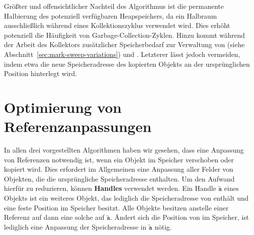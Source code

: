 Größter und offensichtlicher Nachteil des Algorithmus ist die permanente Halbierung des potenziell verfügbaren Heapspeichers, da ein Halbraum ausschließlich während eines Kollektionszyklus verwendet wird.
Dies erhöht potenziell die Häufigkeit von Garbage-Collection-Zyklen.
Hinzu kommt während der Arbeit des Kollektors zusätzlicher Speicherbedarf zur Verwaltung von  (siehe Abschnitt~\ref{sec:mark-sweep-variations}) und .
Letzterer lässt jedoch vermeiden, indem etwa die neue Speicheradresse des kopierten Objekts an der ursprünglichen Position hinterlegt wird.




\section{Optimierung von Referenzanpassungen}
\label{sec:handle}
In allen drei vorgestellten Algorithmen haben wir gesehen, dass eine Anpassung von Referenzen notwendig ist, wenn ein Objekt im Speicher verschoben oder kopiert wird.
Dies erfordert im Allgemeinen eine Anpassung aller Felder von Objekten, die die ursprüngliche Speicheradresse enthalten.
Um den Aufwand hierfür zu reduzieren, können \textbf{Handles} verwendet werden.
Ein Handle $\mathtt{\tilde{a}}$ eines Objekts  ist ein weiteres Objekt, das lediglich die Speicheradresse von  enthält und eine feste Position im Speicher besitzt.
Alle Objekte besitzen anstelle einer Referenz auf  dann eine solche auf $\mathtt{\tilde{a}}$.
Ändert sich die Position von  im Speicher, ist lediglich eine Anpassung der Speicheradresse in $\mathtt{\tilde{a}}$ nötig.



